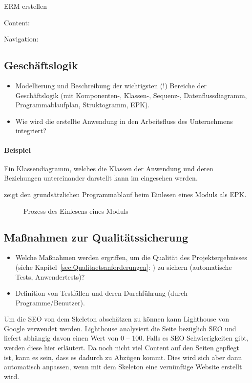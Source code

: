 ERM erstellen

Content:

Navigation:


\subsection{Geschäftslogik}
\label{sec:Geschaeftslogik}

\begin{itemize}
	\item Modellierung und Beschreibung der wichtigsten (!) Bereiche der Geschäftslogik (\zB mit Kom\-po\-nen\-ten-, Klassen-, Sequenz-, Datenflussdiagramm, Programmablaufplan, Struktogramm, \ac{EPK}).
	\item Wie wird die erstellte Anwendung in den Arbeitsfluss des Unternehmens integriert?
\end{itemize}

\paragraph{Beispiel}
Ein Klassendiagramm, welches die Klassen der Anwendung und deren Beziehungen untereinander darstellt kann im  eingesehen werden.

 zeigt den grundsätzlichen Programmablauf beim Einlesen eines Moduls als \ac{EPK}.
\begin{figure}[htb]
\centering
{}
\caption{Prozess des Einlesens eines Moduls}
\label{fig:Modulimport}
\end{figure}


\subsection{Maßnahmen zur Qualitätssicherung}
\label{sec:Qualitaetssicherung}
\begin{itemize}
	\item Welche Maßnahmen werden ergriffen, um die Qualität des Projektergebnisses (siehe Kapitel~\ref{sec:Qualitaetsanforderungen}: ) zu sichern (\zB automatische Tests, Anwendertests)?
	\item \Ggfs Definition von Testfällen und deren Durchführung (durch Programme/Benutzer).
\end{itemize}

Um die SEO von dem Skeleton abschätzen zu können kann Lighthouse von Google verwendet werden. Lighthouse analysiert die Seite bezüglich SEO und liefert abhängig davon einen Wert von 0 – 100. Falls es SEO Schwierigkeiten gibt, werden diese hier erläutert. Da noch nicht viel Content auf den Seiten gepflegt ist, kann es sein, dass es dadurch zu Abzügen kommt. Dies wird sich aber dann automatisch anpassen, wenn mit dem Skeleton eine vernünftige Website erstellt wird.

